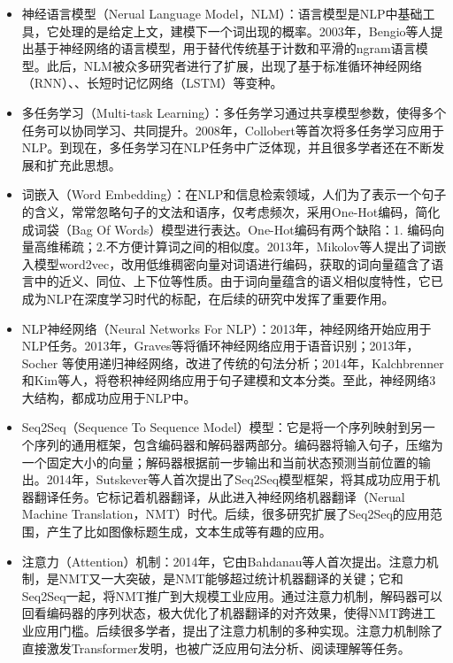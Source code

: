 \begin{enumerate}
\begin{itemize}
    \item 神经语言模型（Nerual Language Model，NLM）：语言模型是NLP中基础工具，它处理的是给定上文，建模下一个词出现的概率。2003年，Bengio等人提出基于神经网络的语言模型\cite{bengio2003neural}，用于替代传统基于计数和平滑的ngram语言模型。此后，NLM被众多研究者进行了扩展，出现了基于标准循环神经网络（RNN）、\cite{mikolov2010recurrent}、长短时记忆网络（LSTM）\cite{graves2013generating}等变种。
    \item 多任务学习（Multi-task Learning）：多任务学习通过共享模型参数，使得多个任务可以协同学习、共同提升。2008年，Collobert等首次将多任务学习\cite{collobert2008unified}应用于NLP。到现在，多任务学习在NLP任务中广泛体现，并且很多学者还在不断发展和扩充此思想。
    \item 词嵌入（Word Embedding）：在NLP和信息检索领域，人们为了表示一个句子的含义，常常忽略句子的文法和语序，仅考虑频次，采用One-Hot编码，简化成词袋（Bag Of Words）模型进行表达。One-Hot编码有两个缺陷：1. 编码向量高维稀疏；2.不方便计算词之间的相似度。2013年，Mikolov等人提出了词嵌入模型word2vec\cite{mikolov2013efficient}，改用低维稠密向量对词语进行编码，获取的词向量蕴含了语言中的近义、同位、上下位等性质。由于词向量蕴含的语义相似度特性，它已成为NLP在深度学习时代的标配，在后续的研究中发挥了重要作用。
    \item NLP神经网络（Neural Networks For NLP）：2013年，神经网络开始应用于NLP任务。2013年，Graves等将循环神经网络\cite{graves2013hybrid}应用于语音识别；2013年，Socher 等使用递归神经网络\cite{socher2013recursive}，改进了传统的句法分析；2014年，Kalchbrenner 和Kim等人，将卷积神经网络\cite{kalchbrenner2014convolutional}\cite{kim2014convolutional}应用于句子建模和文本分类。至此，神经网络3大结构，都成功应用于NLP中。
    \item Seq2Seq（Sequence To Sequence Model）模型：它是将一个序列映射到另一个序列的通用框架，包含编码器和解码器两部分。编码器将输入句子，压缩为一个固定大小的向量；解码器根据前一步输出和当前状态预测当前位置的输出。2014年，Sutskever等人首次提出了Seq2Seq\cite{sutskever2014sequence}模型框架，将其成功应用于机器翻译任务。它标记着机器翻译，从此进入神经网络机器翻译（Nerual Machine Translation，NMT）时代。后续，很多研究扩展了Seq2Seq的应用范围，产生了比如图像标题生成，文本生成等有趣的应用。
    \item 注意力（Attention）机制：2014年，它由Bahdanau\cite{bahdanau2014neural}等人首次提出。注意力机制，是NMT又一大突破，是NMT能够超过统计机器翻译的关键；它和Seq2Seq一起，将NMT推广到大规模工业应用。通过注意力机制，解码器可以回看编码器的序列状态，极大优化了机器翻译的对齐效果，使得NMT跨进工业应用门槛。后续很多学者，提出了注意力机制的多种实现。注意力机制除了直接激发Transformer\cite{vaswani2017attention}发明，也被广泛应用句法分析\cite{vinyals2015grammar}、阅读理解\cite{hermann2015teaching}等任务。

\end{itemize}
\end{enumerate}
